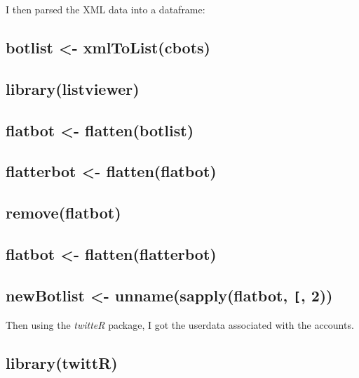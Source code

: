 \documentclass[]{article}
\begin{document}
I then parsed the XML data into a dataframe:

\hypertarget{botlist---xmltolistcbots}{%
\subsection{botlist \textless{}-
xmlToList(cbots)}\label{botlist---xmltolistcbots}}

\hypertarget{librarylistviewer}{%
\subsection{library(listviewer)}\label{librarylistviewer}}

\hypertarget{flatbot---flattenbotlist}{%
\subsection{flatbot \textless{}-
flatten(botlist)}\label{flatbot---flattenbotlist}}

\hypertarget{flatterbot---flattenflatbot}{%
\subsection{flatterbot \textless{}-
flatten(flatbot)}\label{flatterbot---flattenflatbot}}

\hypertarget{removeflatbot}{%
\subsection{remove(flatbot)}\label{removeflatbot}}

\hypertarget{flatbot---flattenflatterbot}{%
\subsection{flatbot \textless{}-
flatten(flatterbot)}\label{flatbot---flattenflatterbot}}

\hypertarget{newbotlist---unnamesapplyflatbot-2}{%
\subsection{\texorpdfstring{newBotlist \textless{}-
unname(sapply(flatbot, \texttt{{[}},
2))}{newBotlist \textless{}- unname(sapply(flatbot, {[}, 2))}}\label{newbotlist---unnamesapplyflatbot-2}}

Then using the \emph{twitteR} package, I got the userdata associated
with the accounts.

\hypertarget{librarytwittr}{%
\subsection{library(twittR)}\label{librarytwittr}}
\end{document}
